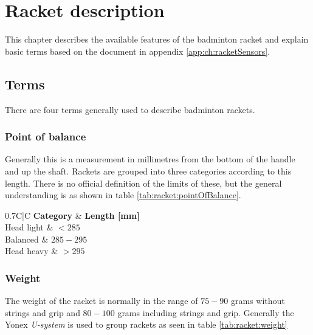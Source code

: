 \chapter{Racket description}
\label{ch:racketDescription}
This chapter describes the available features of the badminton racket and explain basic terms based on the document in appendix \ref{app:ch:racketSensors}.

\section{Terms}
There are four terms generally used to describe badminton rackets.

\subsection*{Point of balance}
Generally this is a measurement in millimetres from the bottom of the handle and up the shaft.
Rackets are grouped into three categories according to this length.
There is no official definition of the limits of these, but the general understanding is as shown in table \ref{tab:racket:pointOfBalance}.

\begin{table}
	\begin{center}
		\begin{tabularx}{0.7\textwidth}{C|C}
			\textbf{Category} & \textbf{Length [mm]} \\
			\hline
			Head light        & $< 285$                \\
			Balanced          & $285-295$              \\
			Head heavy        & $>295$                 \\
		\end{tabularx}
	\end{center}
    \caption{Categorization of a racket's point of balance}
    \label{tab:racket:pointOfBalance}
\end{table}

\subsection*{Weight}
The weight of the racket is normally in the range of $75-90$ grams without strings and grip and $80-100$ grams including strings and grip.
Generally the Yonex \textit{U-system} is used to group rackets as seen in table \ref{tab:racket:weight}

